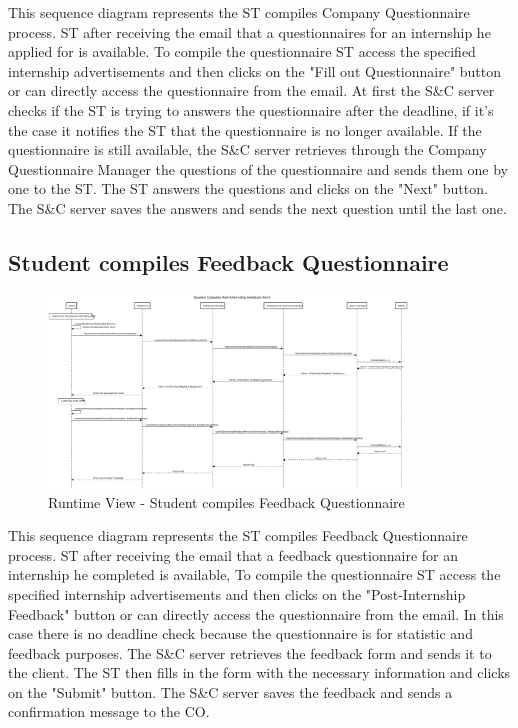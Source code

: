 \par This sequence diagram represents the ST compiles Company Questionnaire process. ST after receiving the email that
a questionnaires for an internship he applied for is available. To compile the questionnaire ST access the specified internship
advertisements and then clicks on the "Fill out Questionnaire" button or can directly access the questionnaire from the email.
At first the S\&C server checks if the ST is trying to answers the questionnaire after the deadline, if it's the case it notifies
the ST that the questionnaire is no longer available. If the questionnaire is still available, the S\&C server retrieves through
the Company Questionnaire Manager the questions of the questionnaire and sends them one by one to the ST.
The ST answers the questions and clicks on the "Next" button. The S\&C server saves the answers and sends the next question
until the last one.

\subsection{Student compiles Feedback Questionnaire}
\label{sub:student-compiles-feedback-questionnaire}%

\begin{figure}[H]
      \centering
      \includegraphics[width=0.85\textwidth]{Images/RV_04b.pdf}
      \caption{Runtime View - Student compiles Feedback Questionnaire}
      \label{fig:rv-student-compiles-feedback-questionnaire}
\end{figure}

\par This sequence diagram represents the ST compiles Feedback Questionnaire process. ST after receiving the email that
a feedback questionnaire for an internship he completed is available, To compile the questionnaire ST access the specified internship
advertisements and then clicks on the "Post-Internship Feedback" button or can directly access the questionnaire from the email.
In this case there is no deadline check because the questionnaire is for statistic and feedback purposes. The S\&C server retrieves
the feedback form and sends it to the client. The ST then fills in the form with the necessary information and clicks on the
"Submit" button. The S\&C server saves the feedback and sends a confirmation message to the CO.

